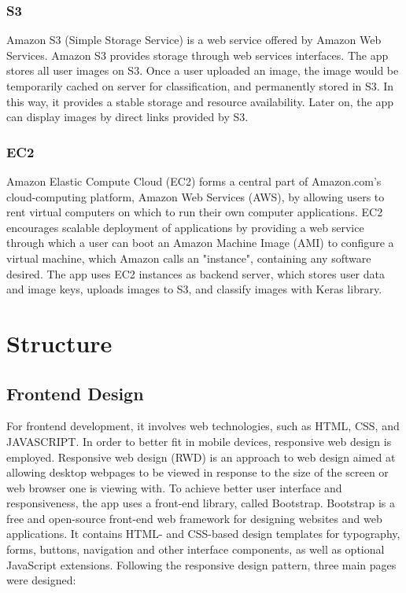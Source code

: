 \documentclass[conference]{IEEEtran}
\begin{document}
\subsubsection{S3}
Amazon S3 (Simple Storage Service) is a web service offered by Amazon Web Services. Amazon S3 provides storage through web services interfaces.\cite{wiki:s3} The app stores all user images on S3. Once a user uploaded an image, the image would be temporarily cached on server for classification, and permanently stored in S3. In this way, it provides a stable storage and resource availability. Later on, the app can display images by direct links provided by S3.

\subsubsection{EC2}
Amazon Elastic Compute Cloud (EC2) forms a central part of Amazon.com's cloud-computing platform, Amazon Web Services (AWS), by allowing users to rent virtual computers on which to run their own computer applications. EC2 encourages scalable deployment of applications by providing a web service through which a user can boot an Amazon Machine Image (AMI) to configure a virtual machine, which Amazon calls an "instance", containing any software desired.\cite{wiki:ec2} The app uses EC2 instances as backend server, which stores user data and image keys, uploads images to S3, and classify images with Keras library.

\section{Structure}

\subsection{Frontend Design}
For frontend development, it involves web technologies, such as HTML, CSS, and JAVASCRIPT. In order to better fit in mobile devices, responsive web design is employed. Responsive web design (RWD) is an approach to web design aimed at allowing desktop webpages to be viewed in response to the size of the screen or web browser one is viewing with.\cite{wiki:rwd} To achieve better user interface and responsiveness, the app uses a front-end library, called Bootstrap. Bootstrap is a free and open-source front-end web framework for designing websites and web applications. It contains HTML- and CSS-based design templates for typography, forms, buttons, navigation and other interface components, as well as optional JavaScript extensions.\cite{wiki:bootstrap} Following the responsive design pattern, three main pages were designed:
\end{document}

